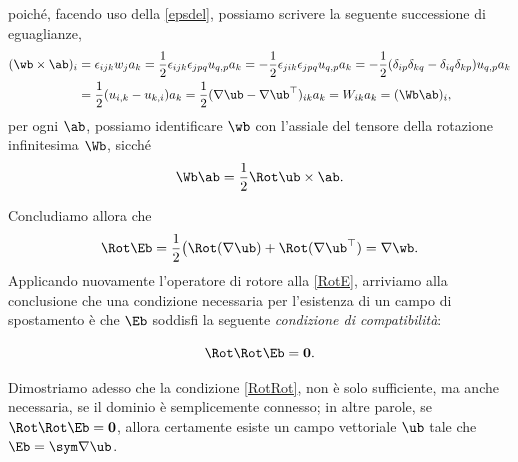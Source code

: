 poiché, facendo uso della \eqref{epsdel}, possiamo scrivere la seguente successione di eguaglianze,
\begin{equation}
	\begin{aligned}
(\wb \times \ab)_i &=\epsilon_{ijk}w_j a_k=\frac12\epsilon_{ijk}\epsilon_{jpq}u_{q,p}a_k=-\frac12\epsilon_{jik}\epsilon_{jpq}u_{q,p}a_k=-\frac{1}{2}(\delta_{ip}\delta_{kq}-\delta_{iq}\delta_{kp})u_{q,p}a_k\\
&=\frac12 (u_{i,k}-u_{k,i})a_k=\frac{1}{2}(\nabla \ub-\nabla \ub^\top)_{ik}a_k=W_{ik}a_k=(\Wb \ab)_i,
\end{aligned}
\end{equation}
per ogni $\ab$, possiamo identificare $\wb$ con l'assiale del tensore della rotazione infinitesima $\Wb$, sicché
\begin{equation}
	\Wb \ab=\frac{1}{2}\Rot \ub \times \ab.
\end{equation}


Concludiamo allora che 
\begin{equation}
	\Rot \Eb =\frac12\big( \Rot (\nabla \ub) + \Rot (\nabla \ub^\top)=\nabla \wb.
\end{equation}
Applicando nuovamente l'operatore di rotore alla \eqref{RotE}, arriviamo alla conclusione che una condizione necessaria per l'esistenza di un campo di spostamento è che $\Eb$ soddisfi la seguente \textit{condizione di compatibilità}:
\begin{definition}
	\begin{equation}\label{RotRot}
\Rot \Rot \Eb =\mathbf{0}.
\end{equation}
\end{definition}


Dimostriamo adesso che la condizione \eqref{RotRot}, non è solo sufficiente, ma anche necessaria, se il dominio è semplicemente connesso; in altre parole, se $\Rot \Rot \Eb=\mathbf{0}$, allora certamente esiste un campo vettoriale $\ub$ tale che $\Eb =\sym \nabla \ub$.

